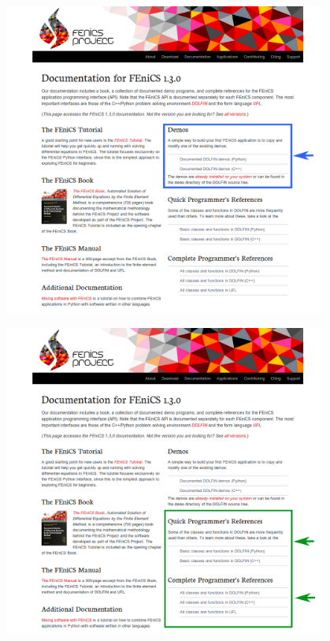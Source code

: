 
\begin{frame}
  \begin{center}
     {\includegraphics[width=0.80\textwidth]{png/fenics-doc-webpage-5.png}}
    \small
  \end{center}
\end{frame}

\begin{frame}
  \begin{center}
     {\includegraphics[width=0.80\textwidth]{png/fenics-doc-webpage-6.png}}
    \small
  \end{center}
\end{frame}

